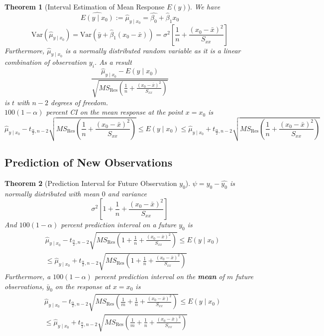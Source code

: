 \documentclass[11pt]{article}
\newcommand{\var}{\mathrm{Var}}
\newtheorem{theorem}{Theorem}[section]
\theoremstyle{definition}
\begin{document}
\begin{theorem}[Interval Estimation of Mean Response {$E(y)$}]
\normalfont We have
\[
\hat{E(y\mid x_0)} := \hat{\mu}_{y\mid x_0} = \hat{\beta_0}+\hat{\beta}_1x_0
\]
\[
\var(\hat{\mu}_{y\mid x_0}) = \var(\bar{y}+\hat{\beta}_1(x_0-\bar{x})) = \sigma^2[\frac{1}{n}+\frac{(x_0-\bar{x})^2}{S_{xx}}]
\]
Furthermore, $\hat{\mu}_{y\mid x_0}$ is a normally distributed random variable as it is a linear combination of observation $y_i$. As a result
\[
\frac{\hat{\mu}_{y\mid x_0} - E(y\mid x_0)}{\sqrt{MS_\text{Res}(\frac{1}{n}+\frac{(x_0-\bar{x})^2}{S_{xx}})}}
\]
is $t$ with $n-2$ degrees of freedom.\\
$100(1-\alpha)$ percent CI on the mean response at the point $x=x_0$ is
\[
\hat{\mu}_{y\mid x_0} - t_{\frac{\alpha}{2},n-2}\sqrt{MS_\text{Res}(\frac{1}{n}+\frac{(x_0-\bar{x})^2}{S_{xx}})} \leq E(y\mid x_0)\leq \hat{\mu}_{y\mid x_0} + t_{\frac{\alpha}{2},n-2}\sqrt{MS_\text{Res}(\frac{1}{n}+\frac{(x_0-\bar{x})^2}{S_{xx}})}
\]
\end{theorem}
\subsection{Prediction of New Observations}
\begin{theorem}[Prediction Interval for Future Observation {$y_0$}]
\normalfont $\psi = y_0-\hat{y_0}$ is normally distributed with mean $0$ and variance
\[
\sigma^2[1+\frac{1}{n}+\frac{(x_0-\bar{x})^2}{S_{xx}}]
\]
And $100(1-\alpha)$ percent prediction interval on a future $y_0$ is
\begin{align*}
&\hat{\mu}_{y\mid x_0} - t_{\frac{\alpha}{2},n-2}\sqrt{MS_\text{Res}(1+\frac{1}{n}+\frac{(x_0-\bar{x})^2}{S_{xx}})} \leq E(y\mid x_0)\\&\leq \hat{\mu}_{y\mid x_0} + t_{\frac{\alpha}{2},n-2}\sqrt{MS_\text{Res}(1+\frac{1}{n}+\frac{(x_0-\bar{x})^2}{S_{xx}})}
\end{align*}
Furthermore, a $100(1-\alpha)$ percent prediction interval on the \textbf{mean} of $m$ future observations, $\bar{y}_0$ on the response at $x=x_0$ is
\begin{align*}
&\hat{\mu}_{y\mid x_0} - t_{\frac{\alpha}{2},n-2}\sqrt{MS_\text{Res}(\frac{1}{m}+\frac{1}{n}+\frac{(x_0-\bar{x})^2}{S_{xx}})} \leq E(y\mid x_0)\\&\leq \hat{\mu}_{y\mid x_0} + t_{\frac{\alpha}{2},n-2}\sqrt{MS_\text{Res}(\frac{1}{m}+\frac{1}{n}+\frac{(x_0-\bar{x})^2}{S_{xx}})}
\end{align*}
\end{theorem}
\end{document}
